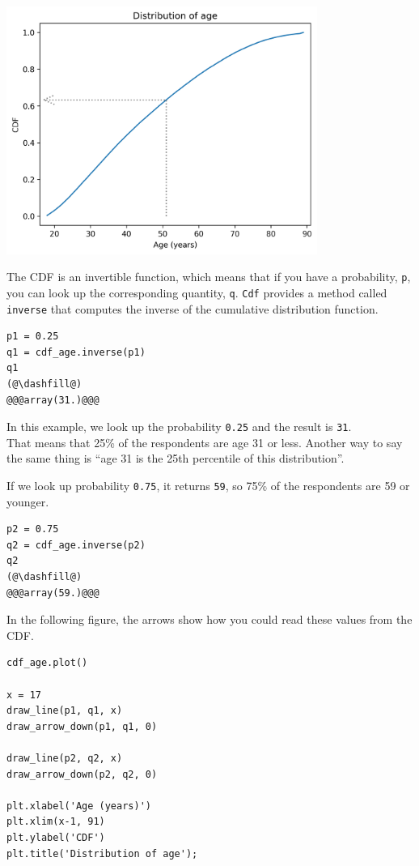 \begin{center}
\includegraphics[width=4in]{chapters/08_distributions_files/08_distributions_71_0.png}
\end{center}

The CDF is an invertible function, which means that if you have a
probability, \passthrough{\lstinline!p!}, you can look up the
corresponding quantity, \passthrough{\lstinline!q!}.
\passthrough{\lstinline!Cdf!} provides a method called
\passthrough{\lstinline!inverse!} that computes the inverse of the
cumulative distribution function.

\begin{lstlisting}[]
p1 = 0.25
q1 = cdf_age.inverse(p1)
q1
(@\dashfill@)
@@@array(31.)@@@
\end{lstlisting}

In this example, we look up the probability
\passthrough{\lstinline!0.25!} and the result is
\passthrough{\lstinline!31!}.\\
That means that 25\% of the respondents are age 31 or less. Another way
to say the same thing is ``age 31 is the 25th percentile of this
distribution''.

If we look up probability \passthrough{\lstinline!0.75!}, it returns
\passthrough{\lstinline!59!}, so 75\% of the respondents are 59 or
younger.

\begin{lstlisting}[]
p2 = 0.75
q2 = cdf_age.inverse(p2)
q2
(@\dashfill@)
@@@array(59.)@@@
\end{lstlisting}

In the following figure, the arrows show how you could read these values
from the CDF.

\begin{lstlisting}[]
cdf_age.plot()

x = 17
draw_line(p1, q1, x)
draw_arrow_down(p1, q1, 0)

draw_line(p2, q2, x)
draw_arrow_down(p2, q2, 0)

plt.xlabel('Age (years)')
plt.xlim(x-1, 91)
plt.ylabel('CDF')
plt.title('Distribution of age');
\end{lstlisting}

